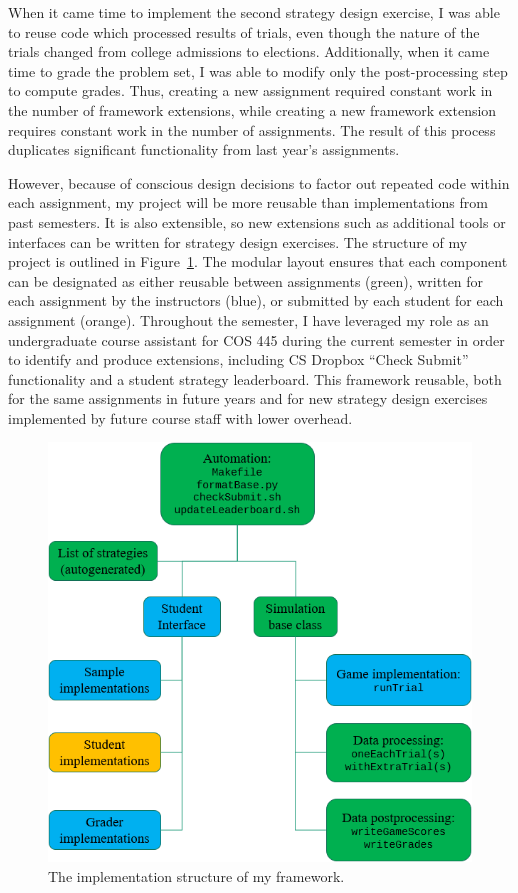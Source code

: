 \documentclass[pageno]{jpaper}
\begin{document}
When it came time to implement the second strategy design exercise, I was able to reuse code which processed results of trials, even though the nature of the trials changed from college admissions to elections.
Additionally, when it came time to grade the problem set, I was able to modify only the post-processing step to compute grades.
Thus, creating a new assignment required constant work in the number of framework extensions, while creating a new framework extension requires constant work in the number of assignments.
The result of this process duplicates significant functionality from last year's assignments.

However, because of conscious design decisions to factor out repeated code within each assignment, my project will be more reusable than implementations from past semesters.
It is also extensible, so new extensions such as additional tools or interfaces can be written for strategy design exercises.
The structure of my project is outlined in Figure~\ref{fig:outline}.
The modular layout ensures that each component can be designated as either reusable between assignments (green), written for each assignment by the instructors (blue), or submitted by each student for each assignment (orange).
Throughout the semester, I have leveraged my role as an undergraduate course assistant for COS 445 during the current semester in order to identify and produce extensions, including CS Dropbox ``Check Submit'' functionality and a student strategy leaderboard.
This framework reusable, both for the same assignments in future years and for new strategy design exercises implemented by future course staff with lower overhead.

\begin{figure}[hbt]
  \centering
  \includegraphics[scale=0.75]{outline.png}
  \caption{The implementation structure of my framework.}\label{fig:outline}
\end{figure}
\end{document}
